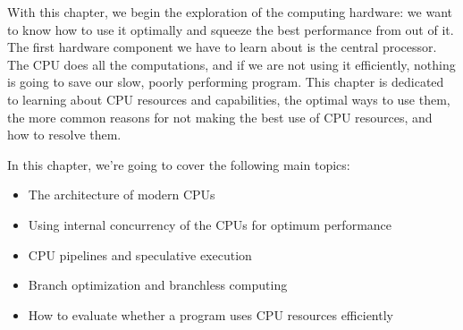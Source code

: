 With this chapter, we begin the exploration of the computing hardware: we want to know how to use it optimally and squeeze the best performance from out of it. The first hardware component we have to learn about is the central processor. The CPU does all the computations, and if we are not using it efficiently, nothing is going to save our slow, poorly performing program. This chapter is dedicated to learning about CPU resources and capabilities, the optimal ways to use them, the more common reasons for not making the best use of CPU resources, and how to resolve them.

In this chapter, we're going to cover the following main topics:

\begin{itemize}
\item The architecture of modern CPUs
\item Using internal concurrency of the CPUs for optimum performance
\item CPU pipelines and speculative execution
\item Branch optimization and branchless computing
\item How to evaluate whether a program uses CPU resources efficiently
\end{itemize}